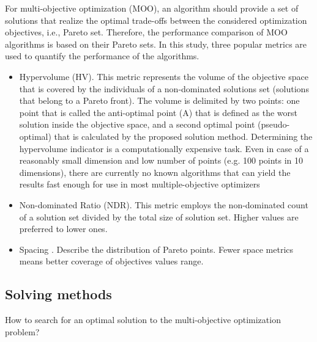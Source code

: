         For multi-objective optimization (MOO), an algorithm should provide a set of solutions that realize the optimal trade-offs between the considered optimization objectives, i.e., Pareto set. Therefore, the performance comparison of MOO algorithms is based on their Pareto sets. In this study, three popular metrics are used to quantify the performance of the algorithms. 
        \begin{itemize}
            \item Hypervolume (HV)\cite{Zitzler2000ComparisonOM}. 
            This metric represents the volume of the objective space that is covered by the individuals of a non-dominated solutions set (solutions that belong to a Pareto front). The volume is delimited by two points: one point that is called the anti-optimal point (A) that is defined as the worst solution inside the objective space, and a second optimal point (pseudo-optimal) that is calculated by the proposed solution method. 
            Determining the hypervolume indicator is a computationally expensive task. Even in case of a reasonably small dimension and low number of points (e.g. 100 points in 10 dimensions), 
            there are currently no known algorithms that can yield the results fast enough for use in most multiple-objective optimizers
            \item Non-dominated Ratio (NDR). This metric employs the non-dominated count of a solution set divided by the total size of solution set. Higher values are preferred to lower ones.
            \item Spacing \cite{Schott1995FaultTD}. Describe the distribution of Pareto points. Fewer space metrics means better coverage of objectives values range.
            
        \end{itemize}

        \subsection{Solving methods}
        How to search for an optimal solution to the multi-objective optimization problem?
        
